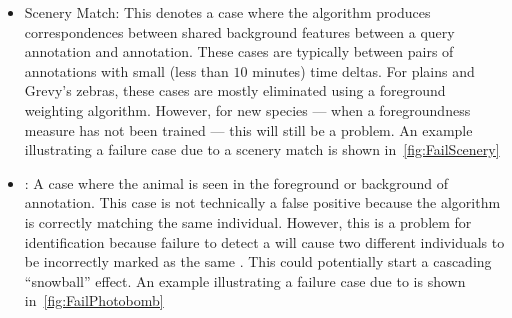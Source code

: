 \begin{itemize}

            \item Scenery Match:
            This denotes a case where the algorithm produces
              correspondences between shared background features between
              a query annotation and \aan{\groundfalse{}} annotation.
            These cases are typically between pairs of annotations with
              small (less than $10$ minutes) time deltas.
            For plains and Grevy's zebras, these cases are mostly
              eliminated using a foreground weighting algorithm.
            However, for new species --- when a foregroundness measure
              has not been trained --- this will still be a problem.
            An example illustrating a failure case due to a scenery
              match is shown in~\cref{fig:FailScenery}

              \FailScenery{}

            \item \Photobomb{}:
            A case where the \groundtrue{} animal is seen in the
              foreground or background of \aan{\groundfalse{}}
              annotation.
            This case is not technically a false positive because the
              algorithm is correctly matching the same individual.
            However, this is a problem for identification because
              failure to detect a \photobomb{} will cause two different
              individuals to be incorrectly marked as the same \name{}.
            This could potentially start a cascading ``snowball''
              effect.
            An example illustrating a failure case due to
              \photobombing{} is shown in~\cref{fig:FailPhotobomb}

              \FailPhotobomb{}

        \end{itemize}


